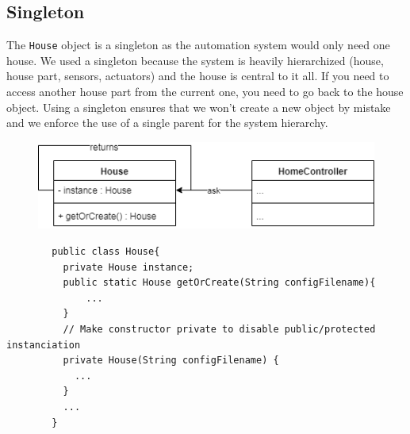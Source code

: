       \subsection{Singleton}
        The \texttt{House} object is a singleton as the automation system would only need one house. We used a singleton because the system is heavily hierarchized (house, house part, sensors, actuators) and the house is central to it all. If you need to access another house part from the current one, you need to go back to the house object. Using a singleton ensures that we won't create a new object by mistake and we enforce the use of a single parent for the system hierarchy.

        \begin{figure}[!h]
          \includegraphics[scale=0.75]{singletonhouse.png}
        \end{figure}

        \begin{verbatim}
        public class House{
          private House instance;
          public static House getOrCreate(String configFilename){
              ...
          }
          // Make constructor private to disable public/protected instanciation
          private House(String configFilename) {
            ...
          }
          ...
        }
        \end{verbatim}

